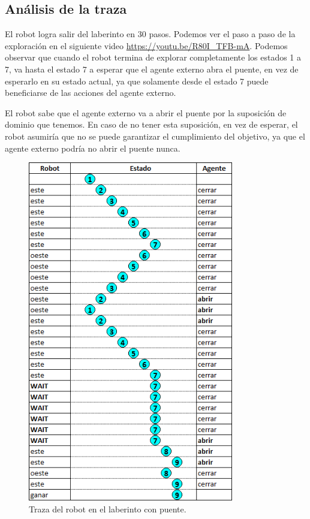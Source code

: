\subsection{Análisis de la traza}

El robot logra salir del laberinto en 30 pasos. Podemos ver el paso a paso de la exploración en el siguiente video \url{https://youtu.be/R80I_TFB-mA}.
Podemos observar que cuando el robot termina de explorar completamente los estados 1 a 7, 
va hasta el estado 7 a esperar que el agente externo abra el puente, en vez de esperarlo en su estado actual, ya que solamente desde el estado 7 
puede beneficiarse de las acciones del agente externo.

\vspace{\baselineskip}

El robot sabe que el agente externo va a abrir el puente por la suposición de dominio que tenemos. En caso de no tener esta suposición, 
en vez de esperar, el robot asumiría que no se puede garantizar el cumplimiento del objetivo, ya que el agente externo podría no abrir el puente nunca.

\begin{figure}[H]
	\centering
		\includegraphics[width=0.8\textwidth]{Imagenes/Laberintos/puente_traza.png}
	\caption{Traza del robot en el laberinto con puente.}
	\label{fig:puente_traza}
\end{figure}
